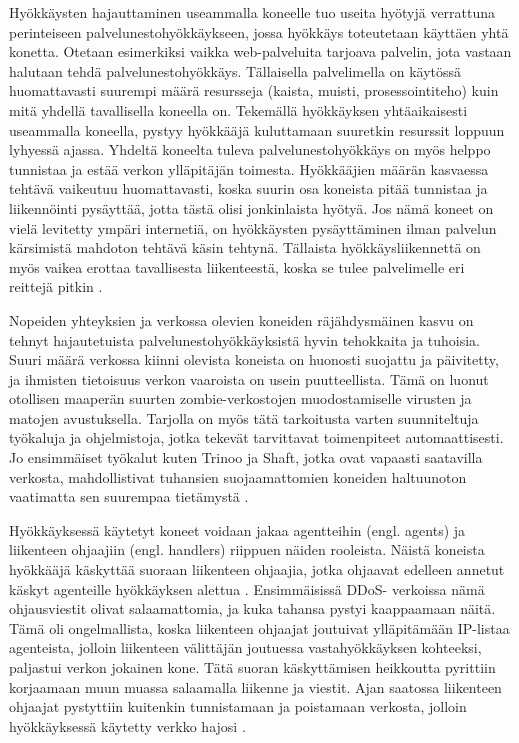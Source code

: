 Hyökkäysten hajauttaminen useammalla koneelle tuo useita hyötyjä verrattuna
perinteiseen palvelunestohyökkäykseen, jossa hyökkäys toteutetaan käyttäen yhtä
konetta. Otetaan esimerkiksi vaikka web-palveluita tarjoava palvelin, jota
vastaan halutaan tehdä palvelunestohyökkäys. Tällaisella palvelimella on
käytössä huomattavasti suurempi määrä resursseja (kaista, muisti,
prosessointiteho) kuin mitä yhdellä tavallisella koneella on. Tekemällä
hyökkäyksen yhtäaikaisesti useammalla koneella, pystyy hyökkääjä kuluttamaan
suuretkin resurssit loppuun lyhyessä ajassa. Yhdeltä koneelta tuleva
palvelunestohyökkäys on myös helppo tunnistaa ja estää verkon ylläpitäjän
toimesta. Hyökkääjien määrän kasvaessa tehtävä vaikeutuu huomattavasti, koska
suurin osa koneista pitää tunnistaa ja liikennöinti pysäyttää, jotta tästä olisi
jonkinlaista hyötyä. Jos nämä koneet on vielä levitetty ympäri internetiä, on
hyökkäysten pysäyttäminen ilman palvelun kärsimistä mahdoton tehtävä käsin
tehtynä. Tällaista hyökkäysliikennettä on myös vaikea erottaa tavallisesta
liikenteestä, koska se tulee palvelimelle eri reittejä pitkin \cite{DDOS}.

Nopeiden yhteyksien ja verkossa olevien koneiden räjähdysmäinen kasvu on tehnyt
hajautetuista palvelunestohyökkäyksistä hyvin tehokkaita ja tuhoisia. Suuri
määrä verkossa kiinni olevista koneista on huonosti suojattu ja päivitetty, ja
ihmisten tietoisuus verkon vaaroista on usein puutteellista. Tämä on luonut
otollisen maaperän suurten zombie-verkostojen muodostamiselle virusten ja
matojen avustuksella. Tarjolla on myös tätä tarkoitusta varten suunniteltuja
työkaluja ja ohjelmistoja, jotka tekevät tarvittavat toimenpiteet
automaattisesti. Jo ensimmäiset työkalut kuten Trinoo ja Shaft, jotka ovat
vapaasti saatavilla verkosta, mahdollistivat tuhansien suojaamattomien koneiden
haltuunoton vaatimatta sen suurempaa tietämystä \cite{DDOS}.

Hyökkäyksessä käytetyt koneet voidaan jakaa agentteihin (engl. agents) ja
liikenteen ohjaajiin (engl. handlers) riippuen näiden rooleista. Näistä
koneista hyökkääjä käskyttää suoraan liikenteen ohjaajia, jotka ohjaavat edelleen
annetut käskyt agenteille hyökkäyksen alettua \cite{WEBS}\cite{DDOS}. Ensimmäisissä DDoS-
verkoissa nämä ohjausviestit olivat salaamattomia, ja kuka tahansa pystyi
kaappaamaan näitä. Tämä oli ongelmallista, koska liikenteen ohjaajat joutuivat
ylläpitämään IP-listaa agenteista, jolloin liikenteen välittäjän joutuessa
vastahyökkäyksen kohteeksi, paljastui verkon jokainen kone. Tätä suoran
käskyttämisen heikkoutta pyrittiin korjaamaan muun muassa salaamalla liikenne ja
viestit. Ajan saatossa liikenteen ohjaajat pystyttiin kuitenkin tunnistamaan ja
poistamaan verkosta, jolloin hyökkäyksessä käytetty verkko hajosi \cite{DDOS}.

